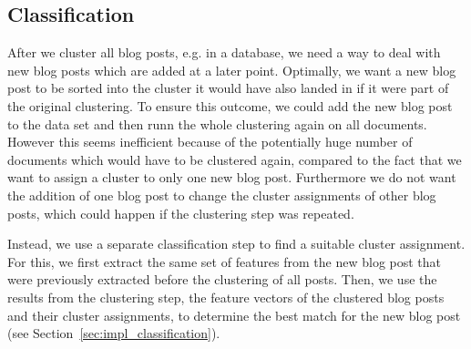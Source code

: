 
\subsection{Classification}
\label{sec:classification}


After we cluster all blog posts, e.g. in a database, we need a way to deal with new blog posts which are added at a later point.
Optimally, we want a new blog post to be sorted into the cluster it would have also landed in if it were part of the original clustering.
To ensure this outcome, we could add the new blog post to the data set and then runn the whole clustering again on all documents.
However this seems inefficient because of the potentially huge number of documents which would have to be clustered again, compared to the fact that we want to assign a cluster to only one new blog post.
Furthermore we do not want the addition of one blog post to change the cluster assignments of other blog posts, which could happen if the clustering step was repeated.


Instead, we use a separate classification step to find a suitable cluster assignment.
For this, we first extract the same set of features from the new blog post that were previously extracted before the clustering of all posts.
Then, we use the results from the clustering step, the feature vectors of the clustered blog posts and their cluster assignments, to determine the best match for the new blog post (see Section~\ref{sec:impl_classification}).